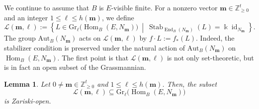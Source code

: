 \documentclass[a4,12pt]{amsart}
\numberwithin{equation}{section} %
\def\Hom{\operatorname{Hom}} %
\def\End{\operatorname{End}} %
\def\Stab{\operatorname{Stab}} %
\def\Gr{\mathrm{Gr}} %
\def\Aut{\mathrm{Aut}} %
\newtheorem{lemma}[theorem]{Lemma} %
\theoremstyle{definition} %
\begin{document}
We continue to assume that $B$ is $E$-visible finite. For a nonzero vector $\mathbf{m}\in\mathbb{Z}_{\geq 0}^t$ and an integer $1\leq \ell\leq h(\mathbf{m})$, we define
\[
\mathcal{L}(\mathbf{m},\ell)
:=
\left\{
L\in \Gr_{\ell}\bigl(\Hom_B(E,N_{\mathbf{m}})\bigr)
\ \middle|\
\Stab_{\End_B(N_{\mathbf{m}})}(L)
=
\Bbbk\operatorname{id}_{N_{\mathbf{m}}}
\right\}.
\]
The group $\Aut_B(N_{\mathbf{m}})$ acts on $\mathcal{L}(\mathbf{m},\ell)$ by $f\cdot L:=f_*(L)$. Indeed, the stabilizer condition is preserved under the natural action of $\Aut_B(N_{\mathbf{m}})$ on $\Hom_B(E,N_{\mathbf{m}})$. The first point is that $\mathcal{L}(\mathbf{m},\ell)$ is not only set-theoretic, but is in fact an open subset of the Grassmannian.

\begin{lemma}\label{lem::Lml-open}
Let $0\neq \mathbf{m}\in\mathbb{Z}_{\geq 0}^t$ and $1\leq\ell\leq h(\mathbf{m})$. Then, the subset
\[
\mathcal{L}(\mathbf{m},\ell)
\subseteq
\Gr_{\ell}\bigl(\Hom_B(E,N_{\mathbf{m}})\bigr)
\]
is Zariski-open.
\end{lemma}
\end{document}
